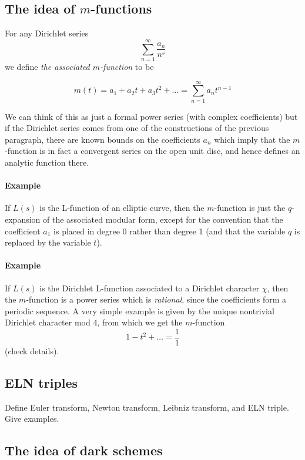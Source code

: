\documentclass[paper=a4, fontsize=11pt]{scrartcl} %
\numberwithin{equation}{section} %
\numberwithin{figure}{section} %
\numberwithin{table}{section} %
\begin{document}
\subsection{The idea of $m$-functions}

For any Dirichlet series
$$   \sum_{n = 1}^{\infty}  \frac{a_n}{n^s}   $$
we define \emph{the associated $m$-function} to be

$$ m(t) = a_1 + a_2 t + a_3 t^2 + \ldots = \sum_{n = 1}^{\infty} a_n t^{n-1}   $$

We can think of this as just a formal power series (with complex coefficients) but if the Dirichlet series comes from one of the constructions of the previous paragraph, there are known bounds on the coefficients $a_n$ which imply that the $m$-function is in fact a convergent series on the open unit disc, and hence defines an analytic function there.


\paragraph{Example}

If $L(s)$ is the L-function of an elliptic curve, then the $m$-function is just the $q$-expansion of the associated modular form, except for the convention that the coefficient $a_1$ is placed in degree 0 rather than degree 1 (and that the variable $q$ is replaced by the variable $t$).


\paragraph{Example}

If $L(s)$ is the Dirichlet L-function associated to a Dirichlet character $\chi$, then the $m$-function is a power series which is \emph{rational}, since the coefficients form a periodic sequence. A very simple example is given by the unique nontrivial Dirichlet character mod 4, from which we get the $m$-function
$$ 1 - t^2 + \ldots  = \frac{1}{1} $$
(check details).


\subsection{ELN triples}

Define Euler transform, Newton transform, Leibniz transform, and ELN triple. Give examples.


\subsection{The idea of dark schemes}
\end{document}
